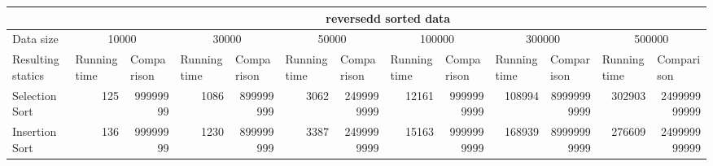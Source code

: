 \documentclass{article}
\begin{document}
\begin{table}[H]
\begin{adjustbox}{width=\columnwidth,center}
\begin{tabular}{|l|rrrrrrrrrrrr|}
\hline
                                   & \multicolumn{12}{c|}{reversedd sorted data}                                                                                                                                                                                                                                                                                                                                                                                           \\ \hline
Data size                          & \multicolumn{2}{c|}{10000}                                          & \multicolumn{2}{c|}{30000}                                          & \multicolumn{2}{c|}{50000}                                          & \multicolumn{2}{c|}{100000}                                          & \multicolumn{2}{c|}{300000}                                          & \multicolumn{2}{c|}{500000}                                         \\ \hline
Resulting statics                  & \multicolumn{1}{l|}{Running time} & \multicolumn{1}{l|}{Comparison} & \multicolumn{1}{l|}{Running time} & \multicolumn{1}{l|}{Comparison} & \multicolumn{1}{l|}{Running time} & \multicolumn{1}{l|}{Comparison} & \multicolumn{1}{l|}{Running time} & \multicolumn{1}{l|}{Comparison}  & \multicolumn{1}{l|}{Running time} & \multicolumn{1}{l|}{Comparison}  & \multicolumn{1}{l|}{Running time} & \multicolumn{1}{l|}{Comparison} \\ \hline
Selection Sort                     & \multicolumn{1}{r|}{125}          & \multicolumn{1}{r|}{99999999}   & \multicolumn{1}{r|}{1086}         & \multicolumn{1}{r|}{899999999}  & \multicolumn{1}{r|}{3062}         & \multicolumn{1}{r|}{2499999999} & \multicolumn{1}{r|}{12161}        & \multicolumn{1}{r|}{9999999999}  & \multicolumn{1}{r|}{108994}       & \multicolumn{1}{r|}{89999999999} & \multicolumn{1}{r|}{302903}       & 249999999999                    \\ \hline
Insertion Sort                     & \multicolumn{1}{r|}{136}          & \multicolumn{1}{r|}{99999999}   & \multicolumn{1}{r|}{1230}         & \multicolumn{1}{r|}{899999999}  & \multicolumn{1}{r|}{3387}         & \multicolumn{1}{r|}{2499999999} & \multicolumn{1}{r|}{15163}        & \multicolumn{1}{r|}{9999999999}  & \multicolumn{1}{r|}{168939}       & \multicolumn{1}{r|}{89999999999} & \multicolumn{1}{r|}{276609}       & 249999999999                    \\ \hline

\end{tabular}
\end{adjustbox}
\end{table}
\end{document}
